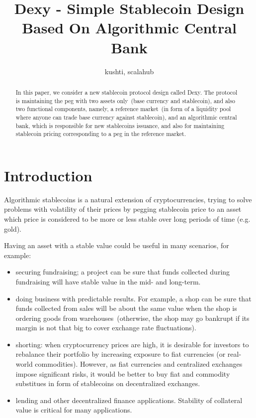 \documentclass{article}   %
\newcommand{\dx}{Dexy}
\begin{document}
\title{Dexy - Simple Stablecoin Design Based On Algorithmic Central Bank}
\author{kushti, scalahub}


\maketitle

\begin{abstract}
In this paper, we consider a new stablecoin protocol design called \dx. The protocol is maintaining the peg with two
assets only~(base currency and stablecoin), and also two functional components, namely, a reference market~(in form of a liquidity pool
where anyone can trade base currency against stablecoin), and an algorithmic central bank, which is responsible for new
stablecoins issuance, and also for maintaining stablecoin pricing corresponding to a peg in the reference market.
\end{abstract}


\section{Introduction}

Algorithmic stablecoins is a natural extension of cryptocurrencies, trying to 
solve problems with volatility of their prices by pegging stablecoin price to an
asset which price is considered to be more or less stable over long periods of time (e.g. gold).

Having an asset with a stable value could be useful in many scenarios, for example:
\begin{itemize}
\item securing fundraising; a project can be sure that funds collected during fundraising will have stable value in the mid- and long-term.
\item doing business with predictable results. For example, a shop can be sure that funds collected from sales will be about the same value when the shop is ordering goods from warehouses~(otherwise, the shop may go bankrupt if its margin is not that big to cover exchange rate fluctuations). 
\item shorting: when cryptocurrency prices are high, it is desirable for investors to rebalance their portfolio by increasing exposure to fiat currencies (or real-world commodities). However, as fiat currencies and centralized exchanges impose significant risks, it would be better to buy fiat and commodity substitues in form of stablecoins on decentralized exchanges.
\item lending and other decentralized finance applications. Stability of collateral value is critical for many applications.
\end{itemize}
\end{document}

